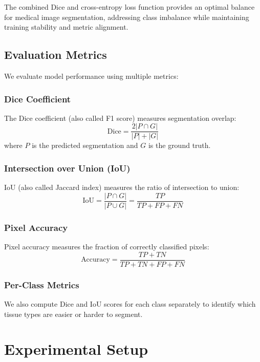 \documentclass[12pt,a4paper]{article}
\begin{document}
The combined Dice and cross-entropy loss function provides an optimal balance for medical image segmentation, addressing class imbalance while maintaining training stability and metric alignment.

\subsection{Evaluation Metrics}

We evaluate model performance using multiple metrics:

\subsubsection{Dice Coefficient}
The Dice coefficient (also called F1 score) measures segmentation overlap:
\begin{equation}
\text{Dice} = \frac{2|P \cap G|}{|P| + |G|}
\end{equation}
where $P$ is the predicted segmentation and $G$ is the ground truth.

\subsubsection{Intersection over Union (IoU)}
IoU (also called Jaccard index) measures the ratio of intersection to union:
\begin{equation}
\text{IoU} = \frac{|P \cap G|}{|P \cup G|} = \frac{TP}{TP + FP + FN}
\end{equation}

\subsubsection{Pixel Accuracy}
Pixel accuracy measures the fraction of correctly classified pixels:
\begin{equation}
\text{Accuracy} = \frac{TP + TN}{TP + TN + FP + FN}
\end{equation}

\subsubsection{Per-Class Metrics}
We also compute Dice and IoU scores for each class separately to identify which tissue types are easier or harder to segment.

\section{Experimental Setup}
\end{document}
